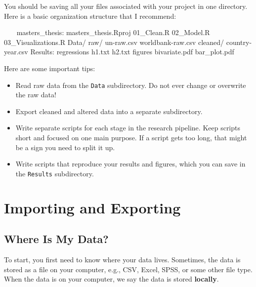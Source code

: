 \documentclass[
]{book}
\newenvironment{Shaded}{\begin{snugshade}}{\end{snugshade}}
\newcommand{\BaseNTok}[1]{\textcolor[rgb]{0.00,0.00,0.81}{#1}}
\newcommand{\NormalTok}[1]{#1}
\providecommand{\tightlist}{%
  \setlength{\itemsep}{0pt}\setlength{\parskip}{0pt}}
\begin{document}
You should be saving all your files associated with your project in one directory. Here is a basic organization structure that I recommend:

\begin{Shaded}
\begin{Highlighting}[]
\NormalTok{~~~}
\NormalTok{masters_thesis:}
\NormalTok{  masters_thesis.Rproj}
\NormalTok{  01_Clean.R}
\NormalTok{  02_Model.R}
\NormalTok{  03_Visualizations.R}
\NormalTok{  Data/}
\BaseNTok{    raw/}
\BaseNTok{      un-raw.csv}
\BaseNTok{      worldbank-raw.csv}
\BaseNTok{    cleaned/}
\BaseNTok{      country-year.csv}
\NormalTok{  Results:}
\BaseNTok{    regressions}
\BaseNTok{      h1.txt}
\BaseNTok{      h2.txt}
\BaseNTok{    figures}
\BaseNTok{      bivariate.pdf}
\BaseNTok{      bar_plot.pdf}
\NormalTok{~~~}
\end{Highlighting}
\end{Shaded}

Here are some important tips:

\begin{itemize}
\tightlist
\item
  Read raw data from the \texttt{Data} subdirectory. Do not ever change or overwrite the raw data!
\item
  Export cleaned and altered data into a separate subdirectory.
\item
  Write separate scripts for each stage in the research pipeline. Keep scripts short and focused on one main purpose. If a script gets too long, that might be a sign you need to split it up.
\item
  Write scripts that reproduce your results and figures, which you can save in the \texttt{Results} subdirectory.
\end{itemize}

\hypertarget{importing-and-exporting}{%
\section{Importing and Exporting}\label{importing-and-exporting}}

\hypertarget{where-is-my-data}{%
\subsection{Where Is My Data?}\label{where-is-my-data}}

To start, you first need to know where your data lives. Sometimes, the data is stored as a file on your computer, e.g., CSV, Excel, SPSS, or some other file type. When the data is on your computer, we say the data is stored \textbf{locally}.
\end{document}
